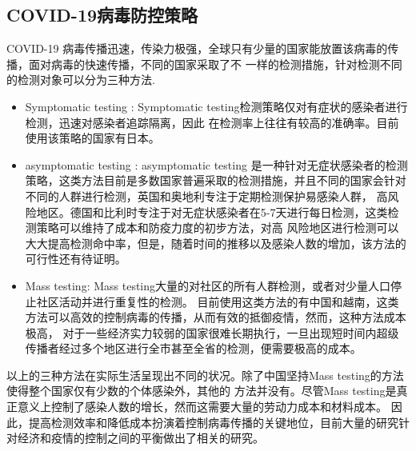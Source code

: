             \subsection{COVID-19病毒防控策略}
                COVID-19 病毒传播迅速，传染力极强，全球只有少量的国家能放置该病毒的传播，面对病毒的快速传播，不同的国家采取了不
                一样的检测措施，针对检测不同的检测对象可以分为三种方法\cite{crozier2021put}.
                \begin{itemize}
                    \item Symptomatic testing : Symptomatic testing检测策略仅对有症状的感染者进行检测，迅速对感染者追踪隔离，因此
                在检测率上往往有较高的准确率。目前使用该策略的国家有日本。
                    \item asymptomatic testing : asymptomatic testing 是一种针对无症状感染者的检测策略，这类方法目前是多数国家普遍采取的检测措施，并且不同的国家会针对不同的人群进行检测，英国和奥地利专注于定期检测保护易感染人群，
                    高风险地区。德国和比利时专注于对无症状感染者在5-7天进行每日检测，这类检测策略可以维持了成本和防疫力度的初步方法，对高
                    风险地区进行检测可以大大提高检测命中率，但是，随着时间的推移以及感染人数的增加，该方法的可行性还有待证明。
                    \item Mass testing: Mass testing大量的对社区的所有人群检测，或者对少量人口停止社区活动并进行重复性的检测。
                目前使用这类方法的有中国和越南，这类方法可以高效的控制病毒的传播，从而有效的抵御疫情，然而，这种方法成本极高，
                对于一些经济实力较弱的国家很难长期执行，一旦出现短时间内超级传播者经过多个地区进行全市甚至全省的检测，便需要极高的成本。
                \end{itemize}
                以上的三种方法在实际生活呈现出不同的状况。除了中国坚持Mass testing的方法使得整个国家仅有少数的个体感染外，其他的
                方法并没有。尽管Mass testing是真正意义上控制了感染人数的增长，然而这需要大量的劳动力成本和材料成本。
                因此，提高检测效率和降低成本扮演着控制病毒传播的关键地位，目前大量的研究针对经济和疫情的控制之间的平衡做出了相关的研究。

